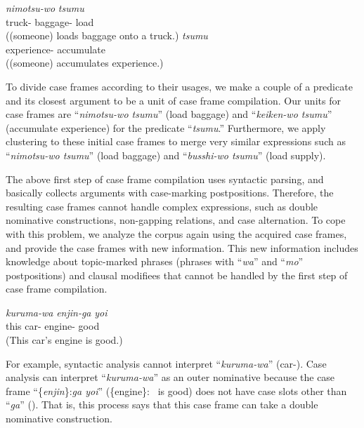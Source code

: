 \documentclass[english]{jnlp_1.4_rep}
\newcommand{\nom}{}
\newcommand{\acc}{}
\newcommand{\dat}{}
\newcommand{\TOP}{}
\begin{document}
\begin{exe}
\ex
 \begin{xlist}
 \ex
   {\textit{nimotsu-wo}} {\textit{tsumu}} \\
       {truck-\dat} {baggage-\acc} {load} \\
  \trans ((someone) loads baggage onto a truck.)
 \ex
   {\textit{tsumu}} \\
       {experience-\acc} {accumulate} \\
  \trans ((someone) accumulates experience.)
 \end{xlist}
\end{exe}

\noindent
To divide case frames according to their usages, we make a couple of a
predicate and its closest argument to be a unit of case frame
compilation. Our units for case frames are ``\textit{nimotsu-wo tsumu}''
(load baggage) and ``\textit{keiken-wo tsumu}'' (accumulate experience)
for the predicate ``\textit{tsumu}.'' Furthermore, we apply clustering
to these initial case frames to merge very similar expressions such as
``\textit{nimotsu-wo tsumu}'' (load baggage) and ``\textit{busshi-wo
tsumu}'' (load supply).

The above first step of case frame compilation uses syntactic parsing,
and basically collects arguments with case-marking
postpositions. Therefore, the resulting case frames cannot handle
complex expressions, such as double nominative constructions,
non-gapping relations, and case alternation. To cope with this problem,
we analyze the corpus again using the acquired case frames, and provide
the case frames with new information. This new information includes
knowledge about topic-marked phrases (phrases with ``\textit{wa}'' and
``\textit{mo}'' postpositions) and clausal modifiees that cannot be
handled by the first step of case frame compilation.

\begin{exe}
\ex
  {\textit{kuruma-wa}} {\textit{enjin-ga}} {\textit{yoi}} \\
      {this} {car-\TOP} {engine-\nom} {good} \\
 \trans (This car's engine is good.)
\end{exe}

For example, syntactic analysis cannot interpret ``\textit{kuruma-wa}''
(car-\TOP). Case analysis can interpret ``\textit{kuruma-wa}'' as an
outer nominative because the case frame ``\{\textit{enjin}\}:\textit{ga
yoi}'' (\{engine\}: \nom\ is good) does not have case slots other than
``\textit{ga}'' (\nom). That is, this process says that this case frame
can take a double nominative construction.
\end{document}
